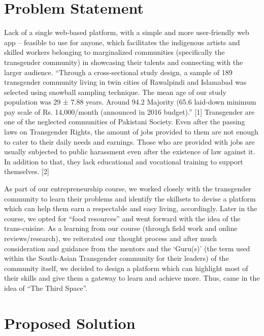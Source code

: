 \section{Problem Statement}

Lack of a single web-based platform, with a simple and more user-friendly web app –
feasible to use for anyone, which facilitates the indigenous artists and skilled workers belonging to
marginalized communities (specifically the transgender community) in showcasing their talents and
connecting with the larger audience.
“Through a cross-sectional study design, a sample of 189 transgender community living in twin cities of
Rawalpindi and Islamabad was selected using snowball sampling technique.
The mean age of our study population was 29 ± 7.88 years. Around 94.2%
Majority (65.6%
laid-down minimum pay scale of Rs. 14,000/month (announced in 2016 budget).” [1]
Transgender are one of the neglected communities of Pakistani Society. Even after the passing laws on
Transgender Rights, the amount of jobs provided to them are not enough to cater to their daily needs
and earnings. Those who are provided with jobs are usually subjected to public harassment even after
the existence of law against it. In addition to that, they lack educational and vocational training to
support themselves. [2]

As part of our entrepreneurship course, we worked closely with the transgender
community to learn their problems and identify the skillsets to devise a platform which can help them
earn a respectable and easy living, accordingly.
Later in the course, we opted for “food resources” and went forward with the idea of the trans-cuisine.
As a learning from our course (through field work and online reviews/research), we reiterated our 
thought process and after much consideration and guidance from the mentors and the ‘Guru(s)’ (the
term used within the South-Asian Transgender community for their leaders) of the community itself, we
decided to design a platform which can highlight most of their skills and give them a gateway to learn
and achieve more. Thus, came in the idea of “The Third Space”.


\section{Proposed Solution}

